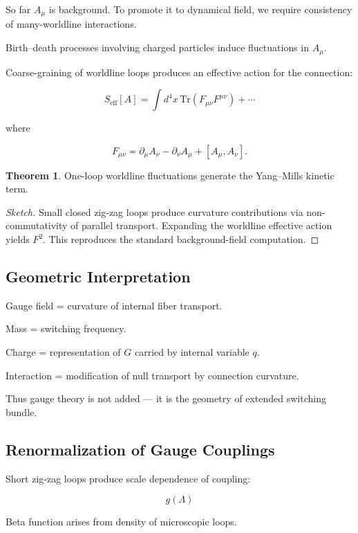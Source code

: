 \documentclass[11pt]{article}
\theoremstyle{definition}
\newtheorem{theorem}[definition]{Theorem}
\begin{document}
So far $A_\mu$ is background.
To promote it to dynamical field,
we require consistency of many-worldline interactions.

Birth–death processes involving charged particles
induce fluctuations in $A_\mu$.

Coarse-graining of worldline loops produces
an effective action for the connection:

\[
S_\text{eff}[A]
=
\int d^4x \,
\mathrm{Tr}(F_{\mu\nu}F^{\mu\nu})
+ \cdots
\]

where

\[
F_{\mu\nu}
=
\partial_\mu A_\nu
-
\partial_\nu A_\mu
+
[A_\mu,A_\nu].
\]

\begin{theorem}
One-loop worldline fluctuations generate
the Yang–Mills kinetic term.
\end{theorem}

\begin{proof}[Sketch]
Small closed zig-zag loops produce curvature contributions
via non-commutativity of parallel transport.
Expanding the worldline effective action yields $F^2$.
This reproduces the standard background-field computation.
\end{proof}

\subsection{Geometric Interpretation}

Gauge field = curvature of internal fiber transport.

Mass = switching frequency.

Charge = representation of $G$ carried by internal variable $q$.

Interaction = modification of null transport by connection curvature.

Thus gauge theory is not added —
it is the geometry of extended switching bundle.

\subsection{Renormalization of Gauge Couplings}

Short zig-zag loops produce scale dependence of coupling:

\[
g(\Lambda)
\]

Beta function arises from density of microscopic loops.
\end{document}

